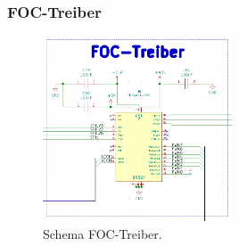 \clearpage
\subsubsection{FOC-Treiber}
\label{subsubsec:FOC-Treiber}

\begin{figure}[h!]
	\centering
	\includegraphics[width=0.5\textwidth]{graphics/Schema_FOC_Treiber}
	\caption{Schema FOC-Treiber.}
	\label{fig:Schema_FOC_Treiber}
\end{figure} 